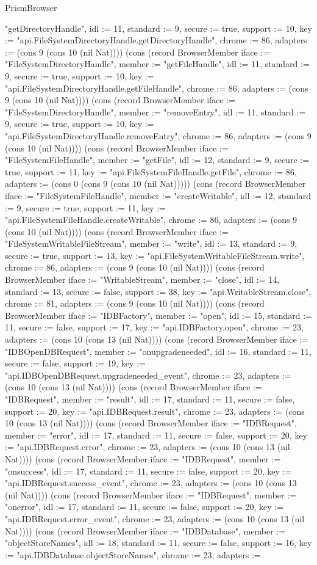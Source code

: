 \begin{lexlean}{PrismBrowser}
\begin{semanticmodule}
{"getDirectoryHandle", idl := 11, standard := 9, secure := true, support := 10, key := "api.FileSystemDirectoryHandle.getDirectoryHandle", chrome := 86, adapters := (cons 9 (cons 10 (nil Nat)))}) (cons (record BrowserMember {iface := "FileSystemDirectoryHandle", member := "getFileHandle", idl := 11, standard := 9, secure := true, support := 10, key := "api.FileSystemDirectoryHandle.getFileHandle", chrome := 86, adapters := (cons 9 (cons 10 (nil Nat)))}) (cons (record BrowserMember {iface := "FileSystemDirectoryHandle", member := "removeEntry", idl := 11, standard := 9, secure := true, support := 10, key := "api.FileSystemDirectoryHandle.removeEntry", chrome := 86, adapters := (cons 9 (cons 10 (nil Nat)))}) (cons (record BrowserMember {iface := "FileSystemFileHandle", member := "getFile", idl := 12, standard := 9, secure := true, support := 11, key := "api.FileSystemFileHandle.getFile", chrome := 86, adapters := (cons 0 (cons 9 (cons 10 (nil Nat))))}) (cons (record BrowserMember {iface := "FileSystemFileHandle", member := "createWritable", idl := 12, standard := 9, secure := true, support := 11, key := "api.FileSystemFileHandle.createWritable", chrome := 86, adapters := (cons 9 (cons 10 (nil Nat)))}) (cons (record BrowserMember {iface := "FileSystemWritableFileStream", member := "write", idl := 13, standard := 9, secure := true, support := 13, key := "api.FileSystemWritableFileStream.write", chrome := 86, adapters := (cons 9 (cons 10 (nil Nat)))}) (cons (record BrowserMember {iface := "WritableStream", member := "close", idl := 14, standard := 13, secure := false, support := 38, key := "api.WritableStream.close", chrome := 81, adapters := (cons 9 (cons 10 (nil Nat)))}) (cons (record BrowserMember {iface := "IDBFactory", member := "open", idl := 15, standard := 11, secure := false, support := 17, key := "api.IDBFactory.open", chrome := 23, adapters := (cons 10 (cons 13 (nil Nat)))}) (cons (record BrowserMember {iface := "IDBOpenDBRequest", member := "onupgradeneeded", idl := 16, standard := 11, secure := false, support := 19, key := "api.IDBOpenDBRequest.upgradeneeded_event", chrome := 23, adapters := (cons 10 (cons 13 (nil Nat)))}) (cons (record BrowserMember {iface := "IDBRequest", member := "result", idl := 17, standard := 11, secure := false, support := 20, key := "api.IDBRequest.result", chrome := 23, adapters := (cons 10 (cons 13 (nil Nat)))}) (cons (record BrowserMember {iface := "IDBRequest", member := "error", idl := 17, standard := 11, secure := false, support := 20, key := "api.IDBRequest.error", chrome := 23, adapters := (cons 10 (cons 13 (nil Nat)))}) (cons (record BrowserMember {iface := "IDBRequest", member := "onsuccess", idl := 17, standard := 11, secure := false, support := 20, key := "api.IDBRequest.success_event", chrome := 23, adapters := (cons 10 (cons 13 (nil Nat)))}) (cons (record BrowserMember {iface := "IDBRequest", member := "onerror", idl := 17, standard := 11, secure := false, support := 20, key := "api.IDBRequest.error_event", chrome := 23, adapters := (cons 10 (cons 13 (nil Nat)))}) (cons (record BrowserMember {iface := "IDBDatabase", member := "objectStoreNames", idl := 18, standard := 11, secure := false, support := 16, key := "api.IDBDatabase.objectStoreNames", chrome := 23, adapters := }
\end{semanticmodule}
\end{lexlean}

